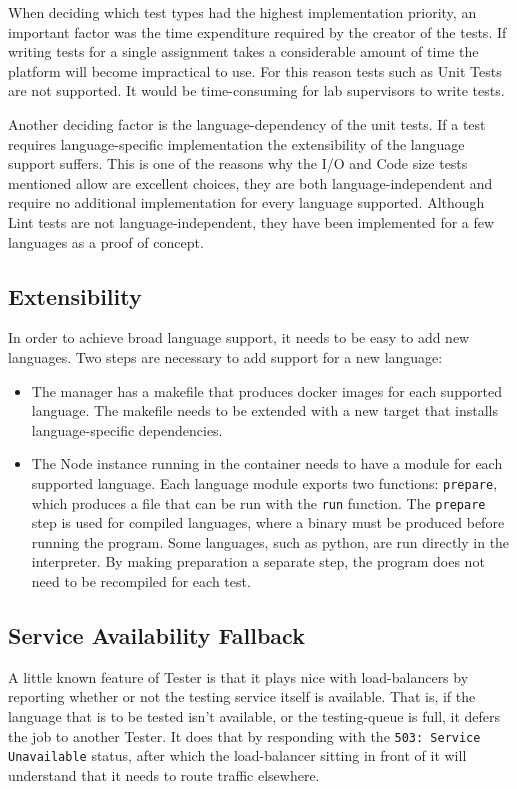 When deciding which test types had the highest implementation priority, an important factor was the time expenditure required by the creator of the tests. If writing tests for a single assignment takes a considerable amount of time the platform will become impractical to use. For this reason tests such as Unit Tests are not supported. It would be time-consuming for lab supervisors to write tests.

Another deciding factor is the language-dependency of the unit tests. If a test requires language-specific implementation the extensibility of the language support suffers. This is one of the reasons why the I/O and Code size tests mentioned allow are excellent choices, they are both language-independent and require no additional implementation for every language supported. Although Lint tests are not language-independent, they have been implemented for a few languages as a proof of concept.

\subsection{Extensibility}
In order to achieve broad language support, it needs to be easy to add new languages. Two steps are necessary to add support for a new language:

\begin{itemize}
\item The manager has a makefile that produces docker images for each supported language. The makefile needs to be extended with a new target that installs language-specific dependencies.

\item The Node instance running in the container needs to have a module for each supported language. Each language module exports two functions: \texttt{prepare}, which produces a file that can be run with the \texttt{run} function. The \texttt{prepare} step is used for compiled languages, where a binary must be produced before running the program. Some languages, such as python, are run directly in the interpreter. By making preparation a separate step, the program does not need to be recompiled for each test.
\end{itemize}

\subsection{Service Availability Fallback}
A little known feature of Tester is that it plays nice with load-balancers by reporting whether or not the testing service itself is available. That is, if the language that is to be tested isn't available, or the testing-queue is full, it defers the job to another Tester. It does that by responding with the \texttt{503: Service Unavailable} status, after which the load-balancer sitting in front of it will understand that it needs to route traffic elsewhere.

